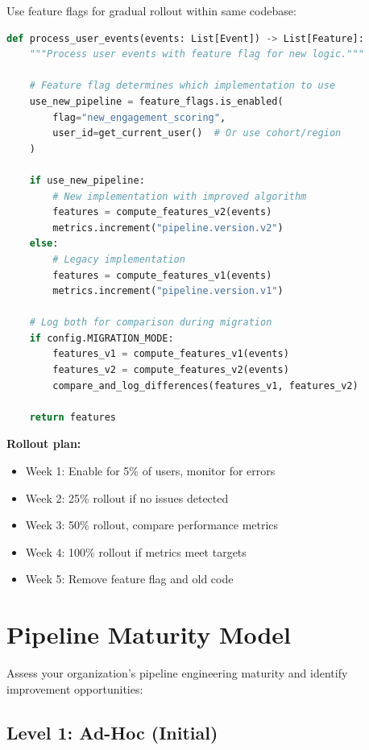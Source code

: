 Use feature flags for gradual rollout within same codebase:

\begin{lstlisting}[language=Python, caption=Feature Flag Pattern for Pipeline Migration]
def process_user_events(events: List[Event]) -> List[Feature]:
    """Process user events with feature flag for new logic."""

    # Feature flag determines which implementation to use
    use_new_pipeline = feature_flags.is_enabled(
        flag="new_engagement_scoring",
        user_id=get_current_user()  # Or use cohort/region
    )

    if use_new_pipeline:
        # New implementation with improved algorithm
        features = compute_features_v2(events)
        metrics.increment("pipeline.version.v2")
    else:
        # Legacy implementation
        features = compute_features_v1(events)
        metrics.increment("pipeline.version.v1")

    # Log both for comparison during migration
    if config.MIGRATION_MODE:
        features_v1 = compute_features_v1(events)
        features_v2 = compute_features_v2(events)
        compare_and_log_differences(features_v1, features_v2)

    return features
\end{lstlisting}

\textbf{Rollout plan:}
\begin{itemize}
    \item Week 1: Enable for 5\% of users, monitor for errors
    \item Week 2: 25\% rollout if no issues detected
    \item Week 3: 50\% rollout, compare performance metrics
    \item Week 4: 100\% rollout if metrics meet targets
    \item Week 5: Remove feature flag and old code
\end{itemize}

\section{Pipeline Maturity Model}

Assess your organization's pipeline engineering maturity and identify improvement opportunities:

\subsection{Level 1: Ad-Hoc (Initial)}

